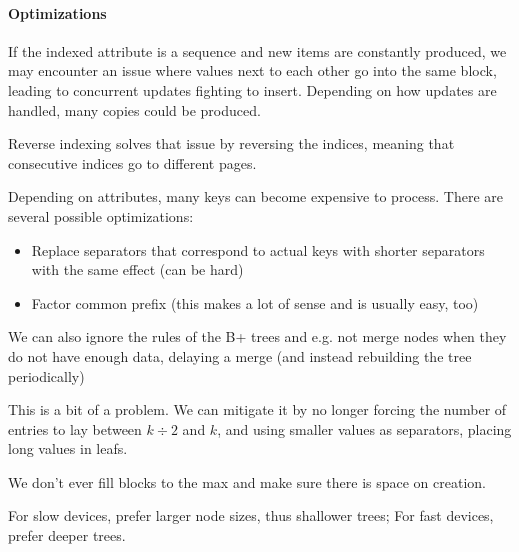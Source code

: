 \paragraph{Optimizations}
If the indexed attribute is a sequence and new items are constantly produced, we may encounter an issue where values next to each other go into the same block,
leading to concurrent updates fighting to insert. Depending on how updates are handled, many copies could be produced.

Reverse indexing solves that issue by reversing the indices, meaning that consecutive indices go to different pages.


 Depending on attributes, many keys can become expensive to process.
There are several possible optimizations:
\begin{itemize}
    \item Replace separators that correspond to actual keys with shorter separators with the same effect (can be hard)
    \item Factor common prefix (this makes a lot of sense and is usually easy, too)
\end{itemize}


 We can also ignore the rules of the B+ trees and e.g. not merge nodes when they do not have enough data,
delaying a merge (and instead rebuilding the tree periodically)


 This is a bit of a problem. We can mitigate it by no longer forcing the number of entries to lay between $k \div 2$ and $k$,
and using smaller values as separators, placing long values in leafs.

 We don't ever fill blocks to the max and make sure there is space on creation.


 For slow devices, prefer larger node sizes, thus shallower trees; For fast devices, prefer deeper trees.

